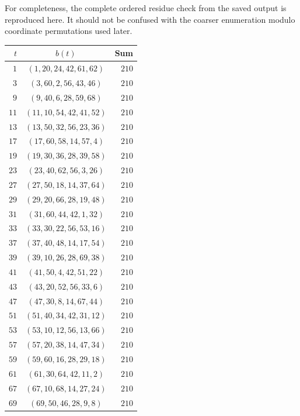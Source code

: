 \documentclass[11pt]{article}
\begin{document}
For completeness, the complete ordered residue check from the saved output is
reproduced here. It should not be confused with the coarser enumeration modulo
coordinate permutations used later.

\begin{longtable}{rcr}
\toprule
$t$ & $b(t)$ & Sum\\
\midrule
\endhead
$1$ & $(1,20,24,42,61,62)$ & $210$\\
$3$ & $(3,60,2,56,43,46)$ & $210$\\
$9$ & $(9,40,6,28,59,68)$ & $210$\\
$11$ & $(11,10,54,42,41,52)$ & $210$\\
$13$ & $(13,50,32,56,23,36)$ & $210$\\
$17$ & $(17,60,58,14,57,4)$ & $210$\\
$19$ & $(19,30,36,28,39,58)$ & $210$\\
$23$ & $(23,40,62,56,3,26)$ & $210$\\
$27$ & $(27,50,18,14,37,64)$ & $210$\\
$29$ & $(29,20,66,28,19,48)$ & $210$\\
$31$ & $(31,60,44,42,1,32)$ & $210$\\
$33$ & $(33,30,22,56,53,16)$ & $210$\\
$37$ & $(37,40,48,14,17,54)$ & $210$\\
$39$ & $(39,10,26,28,69,38)$ & $210$\\
$41$ & $(41,50,4,42,51,22)$ & $210$\\
$43$ & $(43,20,52,56,33,6)$ & $210$\\
$47$ & $(47,30,8,14,67,44)$ & $210$\\
$51$ & $(51,40,34,42,31,12)$ & $210$\\
$53$ & $(53,10,12,56,13,66)$ & $210$\\
$57$ & $(57,20,38,14,47,34)$ & $210$\\
$59$ & $(59,60,16,28,29,18)$ & $210$\\
$61$ & $(61,30,64,42,11,2)$ & $210$\\
$67$ & $(67,10,68,14,27,24)$ & $210$\\
$69$ & $(69,50,46,28,9,8)$ & $210$\\
\bottomrule
\end{longtable}
\end{document}
